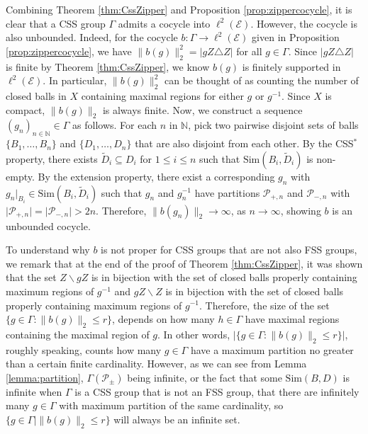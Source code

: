 \documentclass[12pt]{amsart}
\numberwithin{equation}{subsection}
\theoremstyle{definition}
\theoremstyle{definition}
\theoremstyle{remark}
\begin{document}
Combining Theorem \ref{thm:CssZipper} and Proposition \ref{prop:zippercocycle}, it is clear that a CSS group $\Gamma$ admits a cocycle into $\ell^2(\mathcal E)$. However, the cocycle is also unbounded. Indeed, for the cocycle $b: \Gamma \rightarrow \ell^2(\mathcal E)$ given in Proposition \ref{prop:zippercocycle}, we have $\|b(g)\|_2^2 = \vert gZ \triangle Z\vert $ for all $g \in \Gamma$. Since $\vert gZ \triangle Z\vert $ is finite by Theorem \ref{thm:CssZipper}, we know $b(g)$ is finitely supported in $\ell^2(\mathcal E)$. In particular, $\|b(g)\|_2^2$ can be thought of as counting the number of closed balls in $X$ containing maximal regions for either $g$ or $g^{-1}$. Since $X$ is compact, $\|b(g)\|_2$ is always finite.
Now, we construct a sequence $(g_n)_{n \in \mathbb N} \in \Gamma$ as follows. For each $n$ in $\mathbb N$, pick two pairwise disjoint sets of balls $\{B_1, \dots, B_n \}$ and $\{D_1, \dots, D_n\}$ that are also disjoint from each other. By the CSS$^*$ property, there exists $\tilde D_i \subseteq D_i$ for $1 \leq i\leq n$ such that $\text{Sim}(B_i,\tilde D_i)$ is non-empty. By the extension property, there exist a corresponding $g_n$ with $g_n\vert_{B_i} \in \text{Sim}(B_i,\tilde D_i)$ such that $g_n$ and $g_n^{-1}$ have partitions $\mathscr{P}_{+,n}$ and $\mathscr{P}_{-,n}$ with $\vert\mathscr{P}_{+,n}\vert =\vert \mathscr{P}_{-,n}\vert > 2n$. Therefore, $\|b(g_n)\|_2 \rightarrow \infty$, as $n \rightarrow \infty$, showing $b$ is an unbounded cocycle. 


To understand why $b$ is not proper for CSS groups that are not also FSS groups, we remark that at the end of the proof of Theorem \ref{thm:CssZipper}, it was shown that the set $Z\backslash gZ$ is in bijection with the set of closed balls properly containing maximum regions of $g^{-1}$ and $gZ\backslash Z$ is in bijection with the set of closed balls properly containing maximum regions of $g^{-1}$. Therefore, the size of the set $\{g \in \Gamma : \|b(g)\|_2 \leq r \}$, depends on how many $h \in \Gamma$ have maximal regions containing the maximal region of $g$. In other words, $\vert\{g \in \Gamma : \|b(g)\|_2 \leq r \} \vert$, roughly speaking, counts how many $g \in \Gamma$ have a maximum partition no greater than a certain finite cardinality. However, as we can see from Lemma \ref{lemma:partition}, $\Gamma(\mathscr{P}_{\pm})$ being infinite, or the fact that some  $\text{Sim}(B,D)$ is infinite when $\Gamma$ is a CSS group that is not an FSS group, that there are infinitely many $g \in \Gamma$ with maximum partition of the same cardinality, so $\{g \in \Gamma \vert \|b(g)\|_2 \leq r \}$ will always be an infinite set.  
\end{document}
